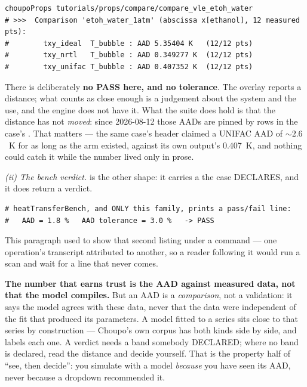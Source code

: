 \documentclass[11pt,a4paper]{article}
\begin{document}
\begin{lstlisting}
choupoProps tutorials/props/compare/compare_vle_etoh_water
# >>>  Comparison 'etoh_water_1atm' (abscissa x[ethanol], 12 measured pts):
#        txy_ideal  T_bubble : AAD 5.35404 K   (12/12 pts)
#        txy_nrtl   T_bubble : AAD 0.349277 K  (12/12 pts)
#        txy_unifac T_bubble : AAD 0.407352 K  (12/12 pts)
\end{lstlisting}

There is deliberately \textbf{no PASS here, and no tolerance}.  The overlay
reports a distance; what counts as close enough is a judgement about the
system and the use, and the engine does not have it.  What the suite does hold
is that the distance has not \emph{moved}: since 2026-08-12 those AADs are
pinned by  rows in the case's .  That matters --- the
same case's header claimed a UNIFAC AAD of ${\sim}2.6$~K for as long as the arm
existed, against its own output's 0.407~K, and nothing could catch it while the
number lived only in prose.

\emph{(ii) The bench verdict.}   is the other shape: it
carries a  the case DECLARES, and it does return a verdict.

\begin{lstlisting}
# heatTransferBench, and ONLY this family, prints a pass/fail line:
#   AAD = 1.8 %   AAD tolerance = 3.0 %   -> PASS
\end{lstlisting}

This paragraph used to show that second listing under a
 command --- one operation's transcript attributed to
another, so a reader following it would run a scan and wait for a line that
never comes.

\begin{keyidea}
\textbf{The number that earns trust is the AAD against measured data, not that
the model compiles.}  But an AAD is a \emph{comparison}, not a validation: it
says the model agrees with these data, never that the data were independent of
the fit that produced its parameters.  A model fitted to a series sits close to
that series by construction --- Choupo's own corpus has both kinds side by
side, and  labels each
one.  A verdict needs a band somebody DECLARED; where no band is declared, read
the distance and decide yourself.  That is the property half of ``see, then
decide'': you simulate with a model \emph{because} you have seen its AAD, never
because a dropdown recommended it.
\end{keyidea}
\end{document}
